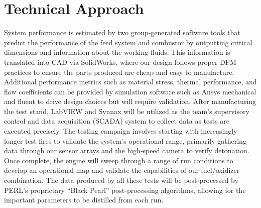 \section*{Technical Approach}

System performance is estimated by two group-generated software tools that predict the performance of the feed system and combustor by outputting critical dimensions and information about the working fluids. This information is translated into CAD via SolidWorks, where our design follows proper DFM practices to ensure the parts produced are cheap and easy to manufacture. Additional performance metrics such as material stress, thermal performance, and flow coefficients can be provided by simulation software such as Ansys mechanical and fluent to drive design choices but will require validation. After manufacturing the test stand, LabVIEW and Synnax will be utilized as the team’s supervisory control and data acquisition (SCADA) system to collect data as tests are executed precisely. The testing campaign involves starting with increasingly longer test fires to validate the system’s operational range, primarily gathering data through our sensor arrays and the high-speed camera to verify detonation. Once complete, the engine will sweep through a range of run conditions to develop an operational map and validate the capabilities of our fuel/oxidizer combination. The data produced by all these tests will be post-processed by PERL’s proprietary “Black Pearl” post-processing algorithms, allowing for the important parameters to be distilled from each run.